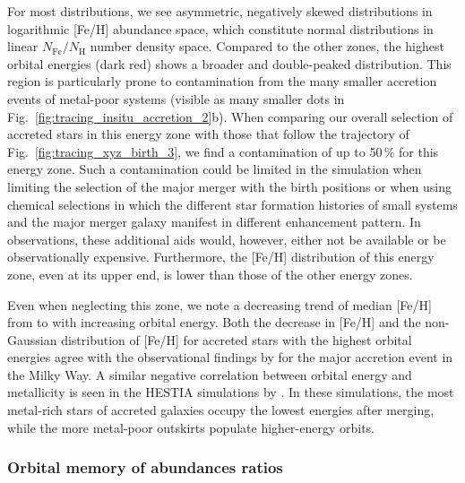\documentclass[fleqn,usenatbib]{mnras}
\newcommand{\changed}[1]{{{#1}}}
\begin{document}
For most distributions, we see asymmetric, negatively skewed distributions in logarithmic [Fe/H] abundance space, which constitute normal distributions in linear $N_\mathrm{Fe}/N_\mathrm{H}$ number density space. Compared to the other zones, the highest orbit\changed{al} energies (dark red) shows a broader and double-peaked distribution. This region is particularly prone to contamination from the many smaller accretion events of metal-poor systems (visible as many smaller dots in Fig.~\ref{fig:tracing_insitu_accretion_2}b). When comparing our overall selection of accreted stars in this energy zone with those that follow the trajectory of Fig.~\ref{fig:tracing_xyz_birth_3}, we find a contamination of up to 50\,\% for this energy zone. Such a contamination could be limited in the simulation when limiting the selection of the major merger with the birth positions or when using chemical selections in which the different star formation histories of small systems and the major merger galaxy manifest in different enhancement pattern. In observations, these additional aids would, however, either not be available or be observationally expensive. Furthermore, the [Fe/H] distribution of this energy zone, even at its upper end, is lower than those of the other energy zones.

Even when neglecting this zone, we note a decreasing trend of median [Fe/H] from  to  with increasing orbit\changed{al} energy. Both the decrease in [Fe/H] and the non-Gaussian distribution of [Fe/H] for accreted stars with the highest orbit\changed{al} energies agree with the observational findings by \citet[][see their Fig.~3]{Skuladottir2025} for the major accretion event in the Milky Way. \changed{A similar negative correlation between orbital energy and metallicity is seen in the HESTIA simulations by \citet[][see their Figs.~8 and~9]{Khoperskov2023c}. In these simulations, the most metal-rich stars of accreted galaxies occupy the lowest energies after merging, while the more metal-poor outskirts populate higher-energy orbits.}

\subsubsection{Orbit\changed{al} memory of abundances ratios}
\end{document}

